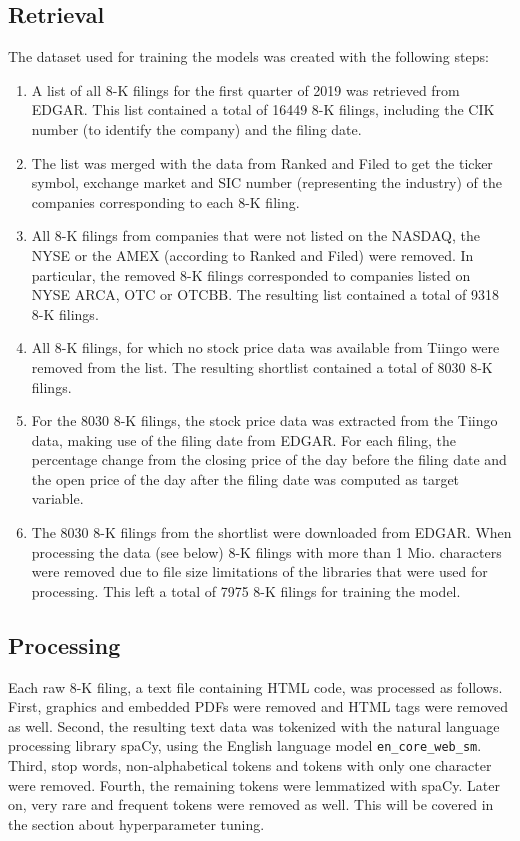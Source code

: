 \documentclass{article}
\begin{document}
	\subsection{Retrieval}
	
	The dataset used for training the models was created with the following steps: 
	
	\begin{enumerate}
		\item A list of all 8-K filings for the first quarter of 2019 was retrieved from EDGAR. This list contained a total of 16449 8-K filings, including the CIK number (to identify the company) and the filing date.
		\item The list was merged with the data from Ranked and Filed to get the ticker symbol, exchange market and SIC number (representing the industry) of the companies corresponding to each 8-K filing.
		\item All  8-K filings from companies that were not listed on the NASDAQ, the NYSE or the AMEX (according to Ranked and Filed) were removed. In particular, the removed 8-K filings corresponded to companies listed on NYSE ARCA, OTC or OTCBB. The resulting list contained a total of 9318 8-K filings.
		\item All 8-K filings, for which no stock price data was available from Tiingo were removed from the list. The resulting shortlist contained a total of 8030 8-K filings. 
		\item For the 8030 8-K filings, the stock price data was extracted from the Tiingo data, making use of the filing date from EDGAR. For each filing, the percentage change from the closing price of the day before the filing date and the open price of the day after the filing date was computed as target variable.
		\item The 8030 8-K filings from the shortlist were downloaded from EDGAR. When processing the data (see below) 8-K filings with more than 1 Mio. characters were removed due to file size limitations of the libraries that were used for processing. This left a total of 7975 8-K filings for training the model.
	\end{enumerate}
	
	\subsection{Processing}
	
	Each raw 8-K filing, a text file containing HTML code, was processed as follows. First, graphics and embedded PDFs were removed and HTML tags were removed as well. Second, the resulting text data was tokenized with the natural language processing library spaCy, using the English language model \lstinline{en_core_web_sm}. Third, stop words, non-alphabetical tokens and tokens with only one character were removed. Fourth, the remaining tokens were lemmatized with spaCy. Later on, very rare and frequent tokens were removed as well. This will be covered in the section about hyperparameter tuning. 
	
\end{document}

